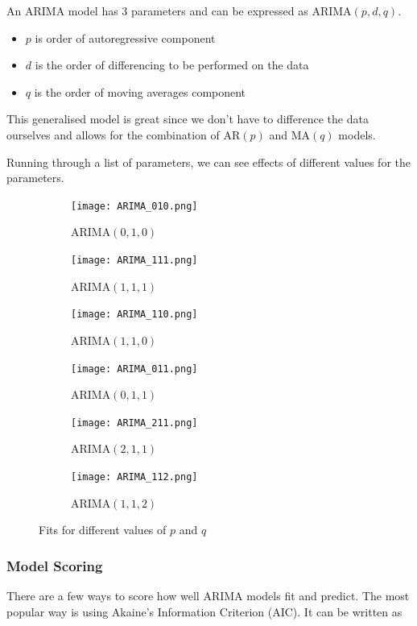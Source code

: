 \documentclass{article}
\begin{document}
  An ARIMA model has 3 parameters and can be expressed as ARIMA$(p,d,q)$.
  \begin{itemize}
    \item $p$ is order of autoregressive component
    \item $d$ is the order of differencing to be performed on the data
    \item $q$ is the order of moving averages component
  \end{itemize}
  This generalised model is great since we don't have to difference the data ourselves and allows for the combination of AR$(p)$ and MA$(q)$ models.  

  Running through a list of parameters, we can see effects of different values for the parameters.

  \begin{figure}[H]
    \centering
    \captionsetup{justification=centering}
    \begin{subfigure}[b]{0.49\linewidth}
      \texttt{[image: ARIMA\_010.png]}
      \caption{ARIMA$(0, 1, 0)$}
    \end{subfigure}
    \begin{subfigure}[b]{0.49\linewidth}
      \texttt{[image: ARIMA\_111.png]}
      \caption{ARIMA$(1, 1, 1)$}
    \end{subfigure}
    \begin{subfigure}[b]{0.49\linewidth}
      \texttt{[image: ARIMA\_110.png]}
      \caption{ARIMA$(1, 1, 0)$}
    \end{subfigure}
    \begin{subfigure}[b]{0.49\linewidth}
      \texttt{[image: ARIMA\_011.png]}
      \caption{ARIMA$(0, 1, 1)$}
    \end{subfigure}
    \begin{subfigure}[b]{0.49\linewidth}
      \texttt{[image: ARIMA\_211.png]}
      \caption{ARIMA$(2, 1, 1)$}
    \end{subfigure}
    \begin{subfigure}[b]{0.49\linewidth}
      \texttt{[image: ARIMA\_112.png]}
      \caption{ARIMA$(1, 1, 2)$}
    \end{subfigure}
    \caption{Fits for different values of $p$ and $q$}
  \end{figure}

  \subsubsection{Model Scoring}
  There are a few ways to score how well ARIMA models fit and predict. The most popular way is using Akaine's Information Criterion (AIC). It can be written as 
\end{document}
